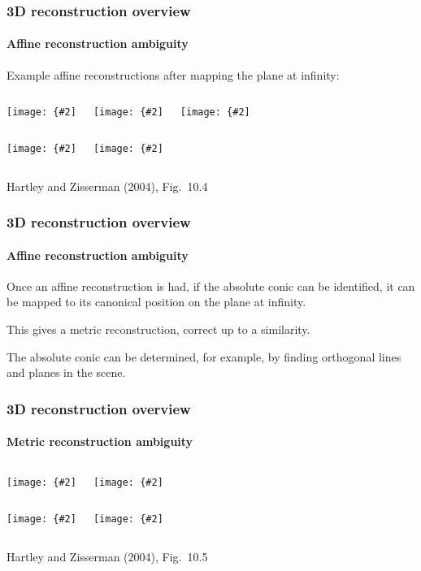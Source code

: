 \documentclass[aspectratio=169]{beamer}
\newcommand{\myfig}[3]{\centerline{\texttt{[image: \{\#2]}}}
    \centerline{\scriptsize #3}}
\begin{document}
\begin{frame}
\frametitle{3D reconstruction overview}
\framesubtitle{Affine reconstruction ambiguity}

Example affine reconstructions after mapping the plane at infinity:

\medskip

\begin{columns}
\column{1.5in}
\myfig{1.3in}{HZ-fig9-4a}{}
\column{1.5in}
\myfig{1.3in}{HZ-fig9-4b}{}
\column{1.5in}
\myfig{1.3in}{HZ-fig9-4c}{}
\end{columns}

\begin{columns}
\column{2in}
\myfig{1.7in}{HZ-fig9-4d}{}
\column{2in}
\myfig{1.7in}{HZ-fig9-4e}{}
\end{columns}

\centerline{\scriptsize Hartley and Zisserman (2004), Fig.\ 10.4}

\end{frame}

\begin{frame}
\frametitle{3D reconstruction overview}
\framesubtitle{Affine reconstruction ambiguity}

Once an affine reconstruction is had, if the \alert{absolute conic}
can be identified, it can be mapped to its canonical position on the
plane at infinity.

\medskip

This gives a \alert{metric reconstruction}, correct
up to a similarity.

\medskip

The absolute conic can be determined, for example, by finding
orthogonal lines and planes in the scene.

\end{frame}

\begin{frame}
\frametitle{3D reconstruction overview}
\framesubtitle{Metric reconstruction ambiguity}

\begin{columns}
\column{1.5in}
\myfig{1.4in}{HZ-fig9-5a}{}
\column{1.5in}
\myfig{1.4in}{HZ-fig9-5b}{}
\end{columns}

\begin{columns}
\column{1.5in}
\myfig{1.4in}{HZ-fig9-5c}{}
\column{1.5in}
\myfig{1.4in}{HZ-fig9-5d}{}
\end{columns}

\centerline{\scriptsize Hartley and Zisserman (2004), Fig.\ 10.5}

\end{frame}
\end{document}
